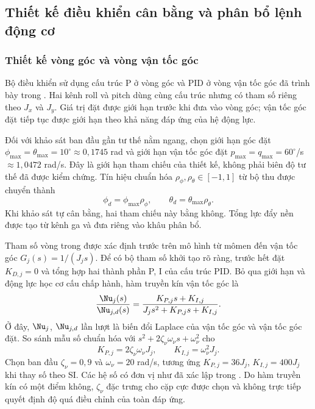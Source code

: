 \subsection{Thiết kế điều khiển cân bằng và phân bổ lệnh động cơ}
\label{sec:design-controller}

\subsubsection{Thiết kế vòng góc và vòng vận tốc góc}

Bộ điều khiển sử dụng cấu trúc P ở vòng góc và PID ở vòng vận tốc góc đã trình bày trong . Hai kênh roll và pitch dùng cùng cấu trúc nhưng có tham số riêng theo $J_x$ và $J_y$. Giá trị đặt được giới hạn trước khi đưa vào vòng góc; vận tốc góc đặt tiếp tục được giới hạn theo khả năng đáp ứng của hệ động lực.

Đối với khảo sát ban đầu gần tư thế nằm ngang, chọn giới hạn góc đặt $\phi_{\max}=\theta_{\max}=10^\circ\approx0{,}1745$ rad và giới hạn vận tốc góc đặt $p_{\max}=q_{\max}=60^\circ$/s $\approx1{,}0472$ rad/s. Đây là giới hạn tham chiếu của thiết kế, không phải biên độ tư thế đã được kiểm chứng. Tín hiệu chuẩn hóa $\rho_\phi,\rho_\theta\in[-1,1]$ từ bộ thu được chuyển thành
\begin{equation}
	\phi_d=\phi_{\max}\rho_\phi,\qquad
	\theta_d=\theta_{\max}\rho_\theta.
	\label{eq:design-angle-reference}
\end{equation}
Khi khảo sát tự cân bằng, hai tham chiếu này bằng không. Tổng lực đẩy nền được tạo từ kênh ga và đưa riêng vào khâu phân bổ.

Tham số vòng trong được xác định trước trên mô hình từ mômen đến vận tốc góc $G_j(s)=1/(J_j s)$. Để có bộ tham số khởi tạo rõ ràng, trước hết đặt $K_{D,j}=0$ và tổng hợp hai thành phần P, I của cấu trúc PID. Bỏ qua giới hạn và động lực học cơ cấu chấp hành, hàm truyền kín vận tốc góc là
\begin{equation}
	\frac{\Nu_j(s)}{\Nu_{j,d}(s)}
	=\frac{K_{P,j}s+K_{I,j}}
	{J_j s^2+K_{P,j}s+K_{I,j}}.
	\label{eq:design-rate-closed-loop}
\end{equation}
Ở đây, $\Nu_j$, $\Nu_{j,d}$ lần lượt là biến đổi Laplace của vận tốc góc và vận tốc góc đặt. So sánh mẫu số chuẩn hóa với $s^2+2\zeta_\nu\omega_\nu s+\omega_\nu^2$ cho
\begin{equation}
	K_{P,j}=2\zeta_\nu\omega_\nu J_j,\qquad
	K_{I,j}=\omega_\nu^2J_j.
	\label{eq:design-rate-gain-selection}
\end{equation}
Chọn ban đầu $\zeta_\nu=0{,}9$ và $\omega_\nu=20$ rad/s, tương ứng $K_{P,j}=36J_j$, $K_{I,j}=400J_j$ khi thay số theo SI. Các hệ số có đơn vị như đã xác lập trong . Do hàm truyền kín có một điểm không, $\zeta_\nu$ đặc trưng cho cặp cực được chọn và không trực tiếp quyết định độ quá điều chỉnh của toàn đáp ứng.

